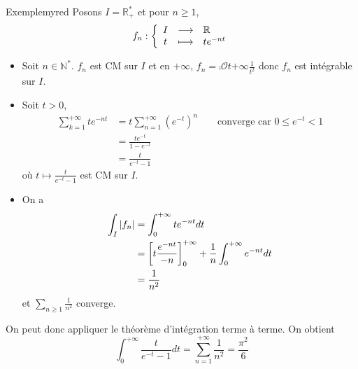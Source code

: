     \begin{omed}{Exemple}{myred}
        Posons $I = \mathbb{R}^*_+$ et pour $n \geq 1$, 
        \[ \fonction{f_n}{I}{\mathbb{R}}{t}{t e^{-nt}} \]
        \begin{itemize}
            \item Soit $n \in \mathbb{N}^*$. $f_n$ est CM sur $I$ et en $+\infty$, $f_n = \comp{\mathcal{O}}{t}{+\infty}{\frac{1}{t^2}}$ donc $f_n$ est intégrable sur $I$.
            \item Soit $t > 0$, 
            \begin{align*}
                \sum_{k=1}^{+\infty} t e^{-nt} 
                &= t \sum_{n=1}^{+\infty} (e^{-t})^n \qquad \text{converge car } 0 \leq e^{-t} < 1 \\
                &= \frac{te^{-t}}{1 - e^{-t}} \\
                &= \frac{t}{e^{-t} - 1}
            \end{align*}
            où $t \mapsto \frac{t}{e^{-t} - 1}$ est CM sur $I$.
            \item On a 
            \begin{align*}
                \int_I \left\lvert f_n\right\rvert 
                &= \int_{0}^{+\infty} t e^{-nt} dt \\
                &= \left[t \frac{e^{-nt}}{-n}\right]_0^{+\infty} + \frac{1}{n} \int_{0}^{+\infty} e^{-nt} dt \\
                &= \frac{1}{n^2}
            \end{align*}
            et $\sum_{n \geq 1} \frac{1}{n^2}$ converge.
        \end{itemize}
        On peut donc appliquer le théorème d’intégration terme à terme. On obtient 
        \[ \int_{0}^{+\infty} \frac{t}{e^{-t} - 1}dt = \sum_{n=1}^{+\infty} \frac{1}{n^2} = \frac{\pi^2}{6} \] 
    \end{omed}

